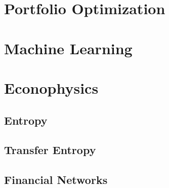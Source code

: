 \documentclass[]{book}
\begin{document}
\part{Portfolio
Optimization}\label{part-portfolio-optimization}

\part{Machine Learning}\label{part-machine-learning}

\part{Econophysics}\label{part-econophysics}

\chapter{Entropy}\label{entropy}

\chapter{Transfer Entropy}\label{transfer-entropy}

\chapter{Financial Networks}\label{financial-networks}


\end{document}
